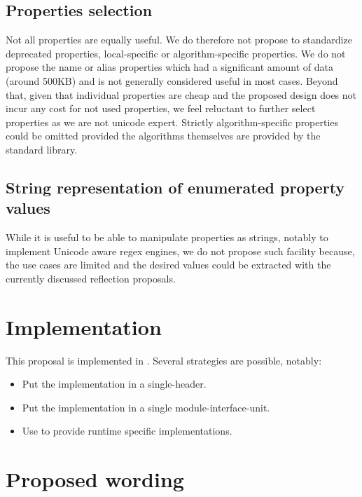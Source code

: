\documentclass{wg21}
\begin{document}
\subsection{Properties selection}

Not all properties are equally useful.
We do therefore not propose to standardize deprecated properties, local-specific or algorithm-specific properties. We do not propose the name or alias properties which had a significant amount of data (around 500KB) and is not generally considered useful in most cases.
Beyond that, given that individual properties are cheap and the proposed design does not incur any cost
for not used properties, we feel reluctant to further select properties as we are not unicode expert.
Strictly algorithm-specific properties could be omitted provided the algorithms themselves are provided by the standard library.


\subsection{String representation of enumerated property values}

While it is useful to be able to manipulate properties as strings, notably to implement Unicode aware regex engines, we do not propose such facility because,
the use cases are limited and the desired values could be extracted with the currently discussed reflection proposals.

\section{Implementation}

This proposal is implemented in \cite{impl}.
Several strategies are possible, notably:
\begin{itemize}
    \item Put the implementation in a single-header.
    \item Put the implementation in a single module-interface-unit.
    \item Use  to provide runtime specific implementations.
\end{itemize}

\section{Proposed wording}
\end{document}
